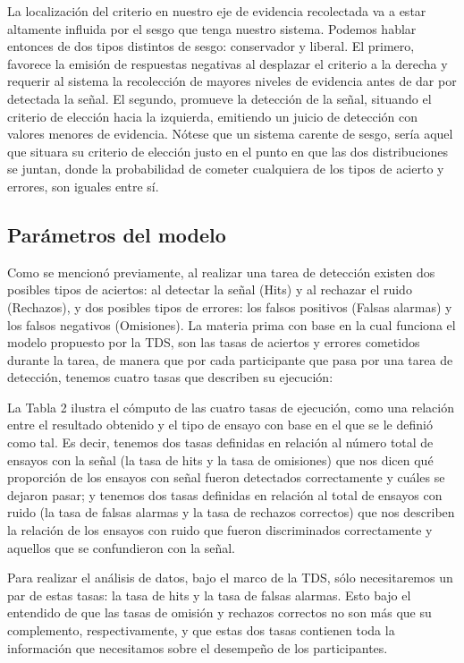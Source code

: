 \begin{itemize}
La localización del criterio en nuestro eje de evidencia recolectada va a estar altamente influida por el sesgo que tenga nuestro sistema. Podemos hablar entonces de dos tipos distintos de sesgo: conservador y liberal. El primero, favorece la emisión de respuestas negativas al desplazar el criterio a la derecha y requerir al sistema la recolección de mayores niveles de evidencia antes de dar por detectada la señal. El segundo, promueve la detección de la señal, situando el criterio de elección hacia la izquierda, emitiendo un juicio de detección con valores menores de evidencia. Nótese que un sistema carente de sesgo, sería aquel que situara su criterio de elección justo en el punto en que las dos distribuciones se juntan, donde la probabilidad de cometer cualquiera de los tipos de acierto y errores, son iguales entre sí.\\


\end{itemize}

\subsection{Parámetros del modelo}

Como se mencionó previamente, al realizar una tarea de detección existen dos posibles tipos de aciertos: al detectar la señal (Hits) y al rechazar el ruido (Rechazos), y dos posibles tipos de errores: los falsos positivos (Falsas alarmas) y los falsos negativos (Omisiones). La materia prima con base en la cual funciona el modelo propuesto por la TDS, son las tasas de aciertos y errores cometidos durante la tarea, de manera que por cada participante que pasa por una tarea de detección, tenemos cuatro tasas que describen su ejecución:

La Tabla 2 ilustra el cómputo de las cuatro tasas de ejecución, como una relación entre el resultado obtenido y el tipo de ensayo con base en el que se le definió como tal. Es decir, tenemos dos tasas definidas en relación al número total de ensayos con la señal (la tasa de hits y la tasa de omisiones) que nos dicen qué proporción de los ensayos con señal fueron detectados correctamente y cuáles se dejaron pasar; y tenemos dos tasas definidas en relación al total de ensayos con ruido (la tasa de falsas alarmas y la tasa de rechazos correctos) que nos describen la relación de los ensayos con ruido que fueron discriminados correctamente y aquellos que se confundieron con la señal.

Para realizar el análisis de datos, bajo el marco de la TDS, sólo necesitaremos un par de estas tasas: la tasa de hits y la tasa de falsas alarmas. Esto bajo el entendido de que las tasas de omisión y rechazos correctos no son más que su complemento, respectivamente, y que estas dos tasas contienen toda la información que necesitamos sobre el desempeño de los participantes.

